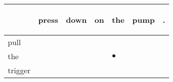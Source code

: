 \documentclass[landscape]{article}
\newcommand{\ssp}{\hspace{2pt}}
\newcommand{\mex}{\cellcolor{g}$\bullet$}
\begin{document}
\noindent\begin{tabular}{|l|p{10pt}|p{10pt}|p{10pt}|p{10pt}|p{10pt}|p{10pt}|}
\hline
&\begin{sideways}\cellcolor{ref0}press\hspace{12pt}\end{sideways}&\begin{sideways}\cellcolor{ref1}down\hspace{12pt}\end{sideways}&\begin{sideways}\cellcolor{ref2}on\hspace{12pt}\end{sideways}&\begin{sideways}\cellcolor{ref3}the\hspace{12pt}\end{sideways}&\begin{sideways}\cellcolor{ref4}pump\hspace{12pt}\end{sideways}&\begin{sideways}\cellcolor{ref5}.\hspace{12pt}\end{sideways}\\
\hline
\ssp pull \ssp&\hspace{2pt}&\hspace{2pt}&\hspace{2pt}&\hspace{2pt}&\hspace{2pt}&\hspace{2pt}\\
\hline
\ssp \cellcolor{ref3}the \ssp&\hspace{2pt}&\hspace{2pt}&\hspace{2pt}&\hspace{2pt}\mex&\hspace{2pt}&\hspace{2pt}\\
\hline
\ssp trigger \ssp&\hspace{2pt}&\hspace{2pt}&\hspace{2pt}&\hspace{2pt}&\hspace{2pt}&\hspace{2pt}\\

\end{tabular}
\end{document}
